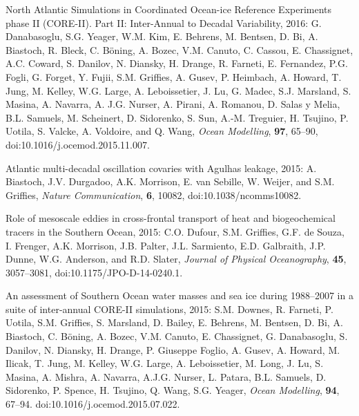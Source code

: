 \begin{etaremune}
\item North Atlantic Simulations in Coordinated Ocean-ice Reference
  Experiments phase II (CORE-II). Part II: Inter-Annual to Decadal
  Variability, 2016: G. Danabasoglu, S.G. Yeager, W.M. Kim,
  E. Behrens, M. Bentsen, D. Bi, A. Biastoch, R. Bleck, C. B\"{o}ning,  A. Bozec, V.M. Canuto, C. Cassou, E. Chassignet, A.C. Coward, S. Danilov, N. Diansky, H. Drange, R. Farneti, E. Fernandez, P.G. Fogli, G. Forget, Y. Fujii, S.M. Grif\/f\/ies, A. Gusev, P. Heimbach, A. Howard, T. Jung, M. Kelley, W.G. Large,
  A. Leboissetier, J. Lu, G. Madec, S.J. Marsland, S. Masina,
  A. Navarra, A. J.G. Nurser, A. Pirani, A. Romanou, D. Salas y Melia, B.L. Samuels, M. Scheinert, D. Sidorenko, S. Sun, A.-M. Treguier, H. Tsujino, P. Uotila, S. Valcke, A. Voldoire, and Q. Wang, {\it Ocean Modelling}, {\bf 97}, 65--90, 
doi:10.1016/j.ocemod.2015.11.007.

\item Atlantic multi-decadal oscillation covaries with Agulhas leakage, 2015: A. Biastoch, J.V. Durgadoo, A.K. Morrison, E. van Sebille, W. Weijer, and S.M. Grif\/f\/ies, {\it Nature Communication}, {\bf 6}, 10082, doi:10.1038/ncomms10082.

\item Role of mesoscale eddies in cross-frontal transport of heat and biogeochemical tracers in the Southern Ocean, 2015: C.O. Dufour, S.M. Grif\/f\/ies, G.F. de Souza, I. Frenger, A.K. Morrison, J.B. Palter, J.L. Sarmiento, E.D. Galbraith, J.P. Dunne, W.G. Anderson, and R.D. Slater, {\it Journal of Physical Oceanography}, {\bf 45}, 3057--3081,
doi:10.1175/JPO-D-14-0240.1.

\item An assessment of Southern Ocean water masses and sea ice during
  1988--2007 in a suite of inter-annual CORE-II simulations, 2015:
  S.M. Downes, R. Farneti, P. Uotila, S.M. Grif\/f\/ies,
  S. Marsland, D. Bailey, E. Behrens, M. Bentsen, D. Bi, A. Biastoch,
  C. B\"oning, A. Bozec, V.M. Canuto, E. Chassignet, G. Danabasoglu,
  S. Danilov, N. Diansky, H. Drange, P. Giuseppe Foglio, A. Gusev,
  A. Howard, M. Ilicak, T.  Jung, M. Kelley, W.G. Large,
  A. Leboissetier, M. Long, J. Lu, S. Masina, A. Mishra, A. Navarra,
  A.J.G. Nurser, L. Patara, B.L. Samuels, D. Sidorenko, P. Spence,
  H. Tsujino, Q. Wang, S.G. Yeager, {\it Ocean Modelling}, {\bf 94},
  67--94.  doi:10.1016/j.ocemod.2015.07.022.




\end{etaremune}
